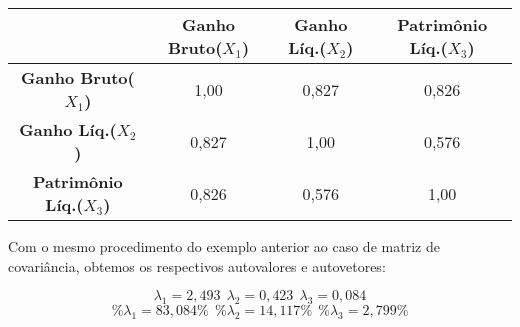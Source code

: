 \documentclass[
  openany]{book}
\begin{document}
\begin{longtable}[]{@{}cccc@{}}
\toprule
& \textbf{Ganho Bruto(\(X_1\))} & \textbf{Ganho Líq.(\(X_2\))} & \textbf{Patrimônio Líq.(\(X_3\))}\tabularnewline
\midrule
\endhead
\textbf{Ganho Bruto(\(X_1\))} & 1,00 & 0,827 & 0,826\tabularnewline
\textbf{Ganho Líq.(\(X_2\))} & 0,827 & 1,00 & 0,576\tabularnewline
\textbf{Patrimônio Líq.(\(X_3\))} & 0,826 & 0,576 & 1,00\tabularnewline
\bottomrule
\end{longtable}

Com o mesmo procedimento do exemplo anterior ao caso de matriz de covariância, obtemos os respectivos autovalores e autovetores:

\[\lambda_1=2,493 \ \ \lambda_2=0,423 \ \ \lambda_3=0,084 \]
\[\%\lambda_1=83,084\% \ \ \%\lambda_2=14,117\% \ \ \%\lambda_3=2,799\%\]
\end{document}
